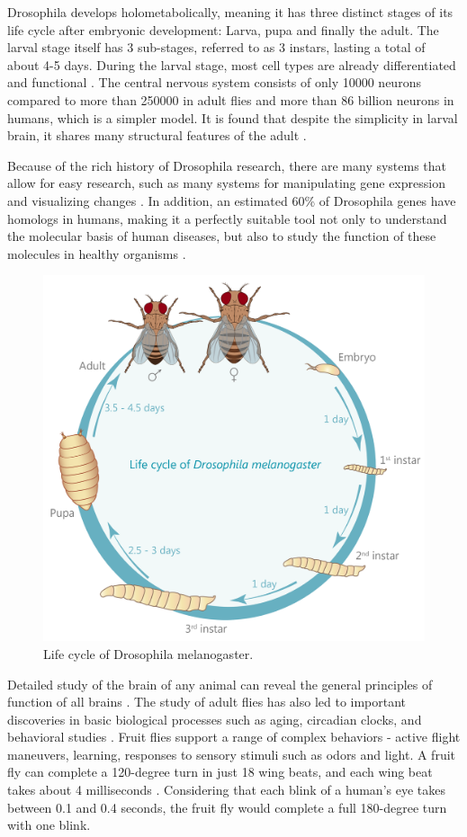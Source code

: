 \documentclass{article}
\begin{document}
	Drosophila develops holometabolically, meaning it has three distinct stages of its life cycle after embryonic development: Larva, pupa and finally the adult. The larval stage itself has 3 sub-stages, referred to as 3 instars, lasting a total of about 4-5 days. During the larval stage, most cell types are already differentiated and functional \cite{cherry_biotech}. The central nervous system consists of only 10000 neurons \cite{Nassif_2003} compared to more than 250000 in adult flies and more than 86 billion neurons in humans, which is a simpler model. It is found that despite the simplicity in larval brain, it shares many structural features of the adult \cite{Mu_2018}. \newline
	
	Because of the rich history of Drosophila research, there are many systems that allow for easy research, such as many systems for manipulating gene expression and visualizing changes \cite{kalderon_lab}. In addition, an estimated 60\% of Drosophila genes have homologs in humans, making it a perfectly suitable tool not only to understand the molecular basis of human diseases, but also to study the function of these molecules in healthy organisms \cite{genome}.
	
	\begin{figure}[H]
		\centering
		\includegraphics[width=0.7\columnwidth]{resources/model_organism_fig_1.png}
		\caption{Life cycle of Drosophila melanogaster. \cite{walter}}
		\label{fig:Life_cycle_of_fruit_fly}
	\end{figure}
	
	Detailed study of the brain of any animal can reveal the general principles of function of all brains \cite{Scheffer_2020}. The study of adult flies has also led to important discoveries in basic biological processes such as aging, circadian clocks, and behavioral studies \cite{cherry_biotech}. Fruit flies support a range of complex behaviors - active flight maneuvers, learning, responses to sensory stimuli such as odors and light. A fruit fly can complete a 120-degree turn in just 18 wing beats, and each wing beat takes about 4 milliseconds \cite{wired}. Considering that each blink of a human's eye takes between 0.1 and 0.4 seconds, the fruit fly would complete a full 180-degree turn with one blink.  
\end{document}

